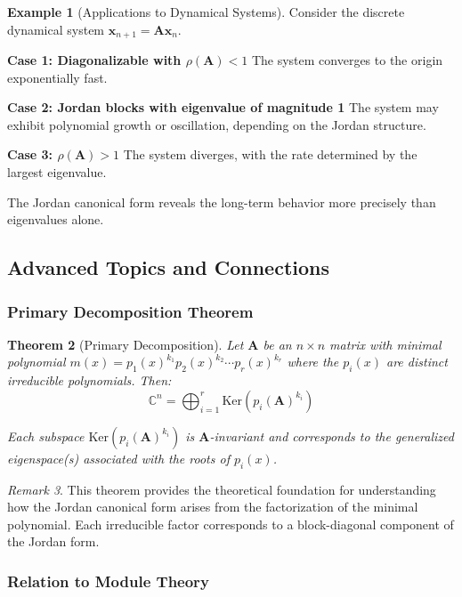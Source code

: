 \documentclass[12pt]{article}
\numberwithin{equation}{section}
\newcommand{\vect}[1]{\boldsymbol{#1}}   %
\newcommand{\mat}[1]{\mathbf{#1}}        %
\theoremstyle{plain}
\newtheorem{theorem}{Theorem}[section]
\theoremstyle{definition}
\newtheorem{example}[theorem]{Example}
\theoremstyle{remark}
\newtheorem{remark}[theorem]{Remark}
\begin{document}
\begin{example}[Applications to Dynamical Systems]
Consider the discrete dynamical system $\vect{x}_{n+1} = \mat{A}\vect{x}_n$.

\textbf{Case 1: Diagonalizable with $\rho(\mat{A}) < 1$}
The system converges to the origin exponentially fast.

\textbf{Case 2: Jordan blocks with eigenvalue of magnitude 1}
The system may exhibit polynomial growth or oscillation, depending on the Jordan structure.

\textbf{Case 3: $\rho(\mat{A}) > 1$}
The system diverges, with the rate determined by the largest eigenvalue.

The Jordan canonical form reveals the long-term behavior more precisely than eigenvalues alone.
\end{example}

\subsection{Advanced Topics and Connections}

\subsubsection{Primary Decomposition Theorem}

\begin{theorem}[Primary Decomposition]
Let $\mat{A}$ be an $n \times n$ matrix with minimal polynomial $m(x) = p_1(x)^{k_1} p_2(x)^{k_2} \cdots p_r(x)^{k_r}$ where the $p_i(x)$ are distinct irreducible polynomials. Then:
$$\mathbb{C}^n = \bigoplus_{i=1}^r \text{Ker}(p_i(\mat{A})^{k_i})$$

Each subspace $\text{Ker}(p_i(\mat{A})^{k_i})$ is $\mat{A}$-invariant and corresponds to the generalized eigenspace(s) associated with the roots of $p_i(x)$.
\end{theorem}

\begin{remark}
This theorem provides the theoretical foundation for understanding how the Jordan canonical form arises from the factorization of the minimal polynomial. Each irreducible factor corresponds to a block-diagonal component of the Jordan form.
\end{remark}

\subsubsection{Relation to Module Theory}
\end{document}
